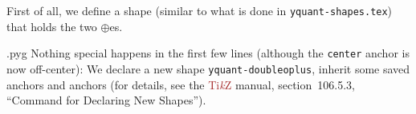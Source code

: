 \documentclass{scrartcl}
\makeatletter
\newenvironment{codeexample*}{%
   \VerbatimEnvironment%
   \let\FVB@VerbatimOut\minted@FVB@VerbatimOut
   \let\FVE@VerbatimOut\minted@FVE@VerbatimOut
   \minted@configlang{tex}%
   \minted@fvset
   \begin{VerbatimOut}[codes={\catcode`\^^I=12},firstline,lastline]{\minted@jobname.pyg}%
}{
   \end{VerbatimOut}%
   \minted@langlinenoson%
   \begin{adjustbox}{center}
       \minted@jobname.pyg %
   \end{adjustbox}\nopagebreak
   \expandafter\minted@pygmentize\expandafter{\minted@lang}%
   \minted@langlinenosoff%
   \par%
}
\def\TikZ{\textcolor{brown}{Ti\textit kZ}}
\makeatother
\begin{document}
\begin{example}
               First of all, we define a shape (similar to what is done in \texttt{yquant-shapes.tex}) that holds the two $\oplus$es.
               \begin{codeexample*}
\makeatletter
{}
               \end{codeexample*}
                \minted@jobname.pyg %
               Nothing special happens in the first few lines (although the \texttt{center} anchor is now off\hyp center): We declare a new shape \texttt{yquant-doubleoplus}, inherit some saved anchors and anchors (for details, see the \TikZ{} manual, section~106.5.3, ``Command for Declaring New Shapes'').

\end{example}
\end{document}
